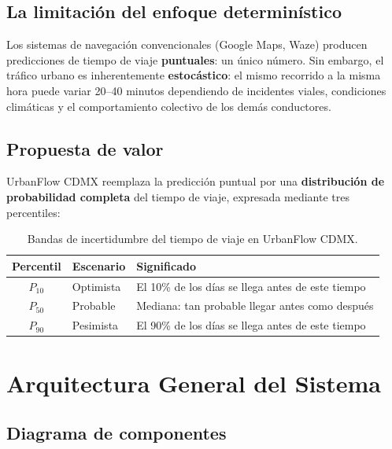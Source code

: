 \documentclass[12pt, a4paper]{article}
\theoremstyle{definition}
\begin{document}
\subsection{La limitación del enfoque determinístico}

Los sistemas de navegación convencionales (Google Maps, Waze) producen predicciones
de tiempo de viaje \textbf{puntuales}: un único número. Sin embargo, el tráfico
urbano es inherentemente \textbf{estocástico}: el mismo recorrido a la misma
hora puede variar 20–40 minutos dependiendo de incidentes viales, condiciones
climáticas y el comportamiento colectivo de los demás conductores.

\subsection{Propuesta de valor}

UrbanFlow CDMX reemplaza la predicción puntual por una
\textbf{distribución de probabilidad completa} del tiempo de viaje,
expresada mediante tres percentiles:

\begin{table}[h!]
\centering
\renewcommand{\arraystretch}{1.3}
\begin{tabular}{clp{8cm}}
\toprule
\textbf{Percentil} & \textbf{Escenario} & \textbf{Significado} \\
\midrule
$P_{10}$ & Optimista  & El 10\% de los días se llega antes de este tiempo \\
$P_{50}$ & Probable   & Mediana: tan probable llegar antes como después \\
$P_{90}$ & Pesimista  & El 90\% de los días se llega antes de este tiempo \\
\bottomrule
\end{tabular}
\caption{Bandas de incertidumbre del tiempo de viaje en UrbanFlow CDMX.}
\end{table}

\section{Arquitectura General del Sistema}

\subsection{Diagrama de componentes}
\end{document}
